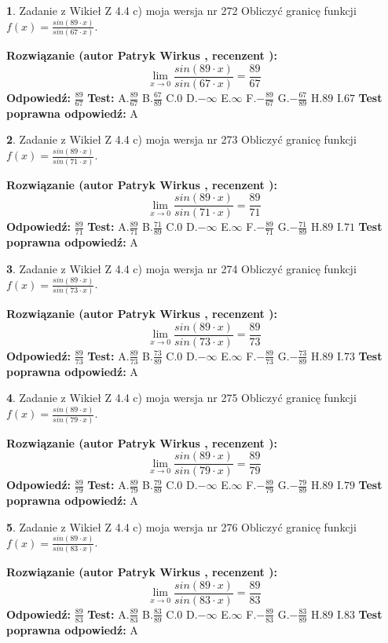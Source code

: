 \documentclass[12pt, a4paper]{article}
\theoremstyle{definition} %
\newtheorem{zad}{}
\newcommand{\zadStart}[1]{\begin{zad}#1\newline}
\newcommand{\zadStop}{\end{zad}}
\newcommand{\rozwStart}[2]{\noindent \textbf{Rozwiązanie (autor #1 , recenzent #2): }\newline}
\newcommand{\rozwStop}{\newline}
\newcommand{\odpStart}{\noindent \textbf{Odpowiedź:}\newline}
\newcommand{\odpStop}{\newline}
\newcommand{\testStart}{\noindent \textbf{Test:}\newline}
\newcommand{\testStop}{\newline}
\newcommand{\kluczStart}{\noindent \textbf{Test poprawna odpowiedź:}\newline}
\newcommand{\kluczStop}{\newline}
\begin{document}
\zadStart{Zadanie z Wikieł Z 4.4 c) moja wersja nr 272}
Obliczyć granicę funkcji $f(x)=\frac{sin(89\cdot x)}{sin(67\cdot x)}$.
\zadStop
\rozwStart{Patryk Wirkus}{}
$$\lim\limits_{x\to 0}\frac{sin(89\cdot x)}{sin(67\cdot x)}=
\frac{89}{67}$$
\rozwStop
\odpStart
$\frac{89}{67}$
\odpStop
\testStart
A.$\frac{89}{67}$
B.$\frac{67}{89}$
C.$0$
D.$-\infty$
E.$\infty$
F.$-\frac{89}{67}$
G.$-\frac{67}{89}$
H.$89$
I.$67$
\testStop
\kluczStart
A
\kluczStop



\zadStart{Zadanie z Wikieł Z 4.4 c) moja wersja nr 273}
Obliczyć granicę funkcji $f(x)=\frac{sin(89\cdot x)}{sin(71\cdot x)}$.
\zadStop
\rozwStart{Patryk Wirkus}{}
$$\lim\limits_{x\to 0}\frac{sin(89\cdot x)}{sin(71\cdot x)}=
\frac{89}{71}$$
\rozwStop
\odpStart
$\frac{89}{71}$
\odpStop
\testStart
A.$\frac{89}{71}$
B.$\frac{71}{89}$
C.$0$
D.$-\infty$
E.$\infty$
F.$-\frac{89}{71}$
G.$-\frac{71}{89}$
H.$89$
I.$71$
\testStop
\kluczStart
A
\kluczStop



\zadStart{Zadanie z Wikieł Z 4.4 c) moja wersja nr 274}
Obliczyć granicę funkcji $f(x)=\frac{sin(89\cdot x)}{sin(73\cdot x)}$.
\zadStop
\rozwStart{Patryk Wirkus}{}
$$\lim\limits_{x\to 0}\frac{sin(89\cdot x)}{sin(73\cdot x)}=
\frac{89}{73}$$
\rozwStop
\odpStart
$\frac{89}{73}$
\odpStop
\testStart
A.$\frac{89}{73}$
B.$\frac{73}{89}$
C.$0$
D.$-\infty$
E.$\infty$
F.$-\frac{89}{73}$
G.$-\frac{73}{89}$
H.$89$
I.$73$
\testStop
\kluczStart
A
\kluczStop



\zadStart{Zadanie z Wikieł Z 4.4 c) moja wersja nr 275}
Obliczyć granicę funkcji $f(x)=\frac{sin(89\cdot x)}{sin(79\cdot x)}$.
\zadStop
\rozwStart{Patryk Wirkus}{}
$$\lim\limits_{x\to 0}\frac{sin(89\cdot x)}{sin(79\cdot x)}=
\frac{89}{79}$$
\rozwStop
\odpStart
$\frac{89}{79}$
\odpStop
\testStart
A.$\frac{89}{79}$
B.$\frac{79}{89}$
C.$0$
D.$-\infty$
E.$\infty$
F.$-\frac{89}{79}$
G.$-\frac{79}{89}$
H.$89$
I.$79$
\testStop
\kluczStart
A
\kluczStop



\zadStart{Zadanie z Wikieł Z 4.4 c) moja wersja nr 276}
Obliczyć granicę funkcji $f(x)=\frac{sin(89\cdot x)}{sin(83\cdot x)}$.
\zadStop
\rozwStart{Patryk Wirkus}{}
$$\lim\limits_{x\to 0}\frac{sin(89\cdot x)}{sin(83\cdot x)}=
\frac{89}{83}$$
\rozwStop
\odpStart
$\frac{89}{83}$
\odpStop
\testStart
A.$\frac{89}{83}$
B.$\frac{83}{89}$
C.$0$
D.$-\infty$
E.$\infty$
F.$-\frac{89}{83}$
G.$-\frac{83}{89}$
H.$89$
I.$83$
\testStop
\kluczStart
A
\kluczStop
\end{document}
